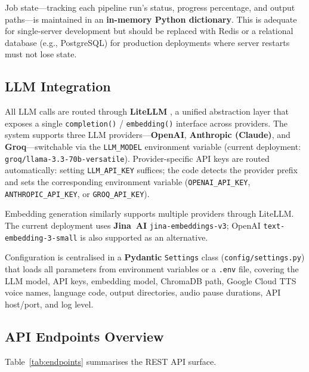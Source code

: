 \documentclass[sigconf,natbib=false]{acmart}   %
\begin{document}
Job state---tracking each pipeline run's status, progress percentage, and output paths---is maintained in an \textbf{in-memory Python dictionary}.  This is adequate for single-server development but should be replaced with Redis or a relational database (e.g., PostgreSQL) for production deployments where server restarts must not lose state.

\subsection{LLM Integration}
All LLM calls are routed through \textbf{LiteLLM} \cite{LiteLLM2024}, a unified abstraction layer that exposes a single \texttt{completion()} / \texttt{embedding()} interface across providers.  The system supports three LLM providers---\textbf{OpenAI}, \textbf{Anthropic (Claude)}, and \textbf{Groq}---switchable via the \texttt{LLM\_MODEL} environment variable (current deployment: \texttt{groq/llama-3.3-70b-versatile}).  Provider-specific API keys are routed automatically: setting \texttt{LLM\_API\_KEY} suffices; the code detects the provider prefix and sets the corresponding environment variable (\texttt{OPENAI\_API\_KEY}, \texttt{ANTHROPIC\_API\_KEY}, or \texttt{GROQ\_API\_KEY}).

Embedding generation similarly supports multiple providers through LiteLLM.  The current deployment uses \textbf{Jina~AI} \texttt{jina-embeddings-v3}; OpenAI \texttt{text-embedding-3-small} is also supported as an alternative.

Configuration is centralised in a \textbf{Pydantic} \texttt{Settings} class (\texttt{config/settings.py}) that loads all parameters from environment variables or a \texttt{.env} file, covering the LLM model, API keys, embedding model, ChromaDB path, Google Cloud TTS voice names, language code, output directories, audio pause durations, API host/port, and log level.

\subsection{API Endpoints Overview}
Table~\ref{tab:endpoints} summarises the REST API surface.
\end{document}
